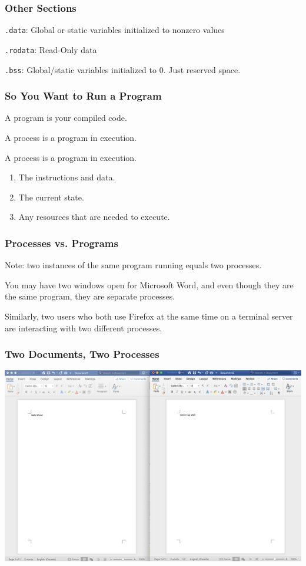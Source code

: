 \begin{frame}
\frametitle{Other Sections}

\texttt{.data}: Global or static variables initialized to nonzero values

\texttt{.rodata}: Read-Only data

\texttt{.bss}: Global/static variables initialized to 0. Just reserved space.

\end{frame}

\begin{frame}
\frametitle{So You Want to Run a Program}

A \alert{program} is your compiled code.

A \alert{process} is a program in execution. 

	A process is a program in execution.

	\begin{enumerate}
		\item The instructions and data.
		\item The current state.
		\item Any resources that are needed to execute.
	\end{enumerate}

\end{frame}


\begin{frame}
	\frametitle{Processes vs. Programs}

	Note: two instances of the same program running equals two processes.

	You may have two windows open for Microsoft Word, and even though they are the same program, they are separate processes.


	Similarly, two users who both use Firefox at the same time on a terminal server are interacting with two different processes.

\end{frame}


\begin{frame}
	\frametitle{Two Documents, Two Processes}

	\begin{center}
		\includegraphics[width=\textwidth]{images/2docs.png}
	\end{center}


\end{frame}

